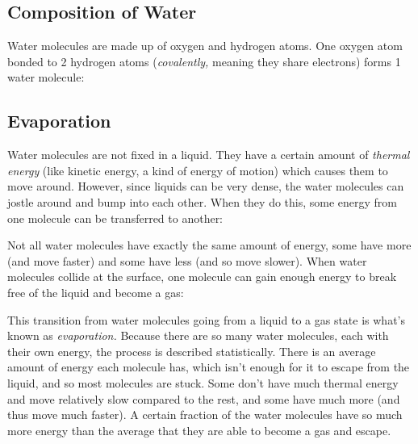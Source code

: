 \documentclass[addpoints,12pt]{exam}
\begin{document}
\subsection{Composition of Water}

Water molecules are made up of oxygen and hydrogen atoms. One oxygen atom bonded to 2 hydrogen atoms (\textit{covalently,} meaning they share electrons) forms 1 water molecule:

\begin{center}

\end{center}

\subsection{Evaporation}

Water molecules are not fixed in a liquid. They have a certain amount of \textit{thermal energy} (like kinetic energy, a kind of energy of motion) which causes them to move around. However, since liquids can be very dense, the water molecules can jostle around and bump into each other. When they do this, some energy from one molecule can be transferred to another:

\begin{center}

\end{center}

Not all water molecules have exactly the same amount of energy, some have more (and move faster) and some have less (and so move slower). When water molecules collide at the surface, one molecule can gain enough energy to break free of the liquid and become a gas:

\begin{center}

\end{center}

This transition from water molecules going from a liquid to a gas state is what's known as \textit{evaporation.} Because there are so many water molecules, each with their own energy, the process is described statistically. There is an average amount of energy each molecule has, which isn't enough for it to escape from the liquid, and so most molecules are stuck. Some don't have much thermal energy and move relatively slow compared to the rest, and some have much more (and thus move much faster). A certain fraction of the water molecules have so much more energy than the average that they are able to become a gas and escape.
\end{document}
